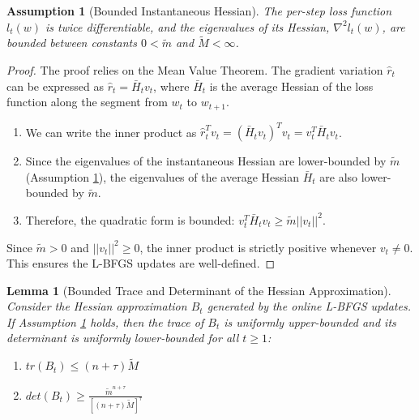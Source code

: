 \documentclass[a4paper,12pt]{article}
\newtheorem{lemma}[theorem]{Lemma}
\newtheorem{assumption}[theorem]{Assumption}
\begin{document}
\begin{assumption}[Bounded Instantaneous Hessian]
\label{assum:bounded-hessian}
The per-step loss function $l_t(w)$ is twice differentiable, and the eigenvalues of its Hessian, $\nabla^{2} l_t(w)$, are bounded between constants $0 < \tilde{m}$ and $\tilde{M} < \infty$.
\end{assumption}

\begin{proof}
The proof relies on the Mean Value Theorem. The gradient variation $\hat{r}_t$ can be expressed as $\hat{r}_t = \bar{H}_t v_t$, where $\bar{H}_t$ is the average Hessian of the loss function along the segment from $w_t$ to $w_{t+1}$.
\begin{enumerate}
    \item We can write the inner product as $\hat{r}_t^{T} v_t = ( \bar{H}_t v_t)^{T} v_t = v_t^{T} \bar{H}_t v_t$.
    
    \item Since the eigenvalues of the instantaneous Hessian are lower-bounded by $\tilde{m}$ (Assumption \ref{assum:bounded-hessian}), the eigenvalues of the average Hessian $\bar{H}_t$ are also lower-bounded by $\tilde{m}$.
    
    \item Therefore, the quadratic form is bounded: $v_t^{T} \bar{H}_t v_t \ge \tilde{m} ||v_t||^2$.
\end{enumerate}
Since $\tilde{m} > 0$ and $||v_t||^{2} \ge 0$, the inner product is strictly positive whenever $v_t \neq 0$. This ensures the L-BFGS updates are well-defined.
\end{proof}

\begin{lemma}[Bounded Trace and Determinant of the Hessian Approximation]
\label{lem:trace-det-bound}
Consider the Hessian approximation $B_t$ generated by the online L-BFGS updates. If Assumption \ref{assum:bounded-hessian} holds, then the trace of $B_t$ is uniformly upper-bounded and its determinant is uniformly lower-bounded for all $t \ge 1$:
\begin{enumerate}
    \item $tr(B_t) \le (n+\tau)\tilde{M}$
    \item $det(B_t) \ge \frac{\tilde{m}^{n+\tau}}{[(n+\tau)\tilde{M}]^{\tau}}$
\end{enumerate}
\end{lemma}
\end{document}
